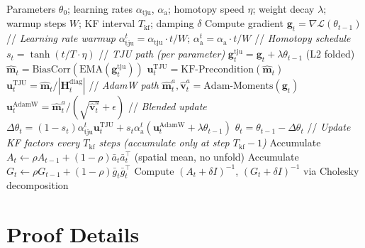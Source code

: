 \documentclass[10pt,twocolumn]{article}
\newcommand{\method}{LAFTJU}
\begin{document}
\begin{algorithm}[ht]
\caption{\method{} Optimizer}
\label{alg:laftju}
\begin{algorithmic}[1]
\REQUIRE Parameters $\theta_0$; learning rates $\alpha_{\text{tju}}$, $\alpha_{\text{a}}$; homotopy speed $\eta$; weight decay $\lambda$; warmup steps $W$; KF interval $T_{\text{kf}}$; damping $\delta$
    \STATE Compute gradient $\mathbf{g}_t = \nabla \mathcal{L}(\theta_{t-1})$
    \STATE // \textit{Learning rate warmup}
        \STATE $\alpha_{\text{tju}}^t = \alpha_{\text{tju}} \cdot t/W$; \quad $\alpha_{\text{a}}^t = \alpha_{\text{a}} \cdot t/W$
    \ENDIF
    \STATE // \textit{Homotopy schedule}
    \STATE $s_t = \tanh(t/T \cdot \eta)$
    \STATE // \textit{TJU path (per parameter)}
    \STATE $\mathbf{g}_t^{\text{tju}} = \mathbf{g}_t + \lambda \theta_{t-1}$ \quad (L2 folded)
    \STATE $\hat{\mathbf{m}}_t = \text{BiasCorr}(\text{EMA}(\mathbf{g}_t^{\text{tju}}))$
        \STATE $\mathbf{u}_t^{\text{TJU}} = \text{KF-Precondition}(\hat{\mathbf{m}}_t)$
    \ELSE
        \STATE $\mathbf{u}_t^{\text{TJU}} = \hat{\mathbf{m}}_t / |\mathbf{H}_t^{\text{diag}}|$
    \ENDIF
    \STATE // \textit{AdamW path}
    \STATE $\hat{\mathbf{m}}_t^a, \hat{\mathbf{v}}_t^a = \text{Adam-Moments}(\mathbf{g}_t)$
    \STATE $\mathbf{u}_t^{\text{AdamW}} = \hat{\mathbf{m}}_t^a / (\sqrt{\hat{\mathbf{v}}_t^a} + \epsilon)$
    \STATE // \textit{Blended update}
    \STATE $\Delta\theta_t = (1-s_t) \alpha_{\text{tju}}^t \mathbf{u}_t^{\text{TJU}} + s_t \alpha_{\text{a}}^t (\mathbf{u}_t^{\text{AdamW}} + \lambda\theta_{t-1})$
    \STATE $\theta_t = \theta_{t-1} - \Delta\theta_t$
    \STATE // \textit{Update KF factors every $T_{{\text{kf}}}$ steps (accumulate only at step $T_{{\text{kf}}}-1$)}
        \STATE Accumulate $A_t \leftarrow \rho A_{t-1} + (1-\rho)\bar{a}_t\bar{a}_t^\top$ (spatial mean, no unfold)
        \STATE Accumulate $G_t \leftarrow \rho G_{t-1} + (1-\rho)\bar{g}_t\bar{g}_t^\top$
    \ENDIF
        \STATE Compute $(A_t + \delta I)^{-1}$, $(G_t + \delta I)^{-1}$ via Cholesky decomposition
    \ENDIF
\ENDFOR
\end{algorithmic}
\end{algorithm}

\section{Proof Details}
\label{app:proofs}
\end{document}
